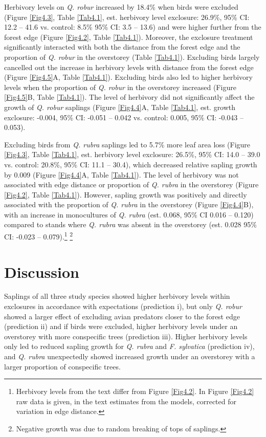 \documentclass[b5paper,10pt]{book} %
\begin{document}
Herbivory levels on \textit{Q. robur} increased by 18.4\% when birds were excluded (Figure \ref{Fig4.3}, Table \ref{Tab4.1}, est. herbivory level exclosure: 26.9\%, 95\% CI: 12.2 -- 41.6 vs. control: 8.5\% 95\% CI: 3.5 -- 13.6) and were higher further from the forest edge (Figure \ref{Fig4.2}, Table \ref{Tab4.1}). Moreover, the exclosure treatment significantly interacted with both the distance from the forest edge and the proportion of \textit{Q. robur} in the overstorey (Table \ref{Tab4.1}). Excluding birds largely cancelled out the increase in herbivory levels with distance from the forest edge (Figure \ref{Fig4.5}A, Table \ref{Tab4.1}). Excluding birds also led to higher herbivory levels when the proportion of \textit{Q. robur} in the overstorey increased (Figure \ref{Fig4.5}B, Table \ref{Tab4.1}). The level of herbivory did not significantly affect the growth of \textit{Q. robur} saplings (Figure \ref{Fig4.4}A, Table \ref{Tab4.1}, est. growth exclosure: -0.004, 95\% CI: -0.051 -- 0.042 vs. control: 0.005, 95\% CI: -0.043 -- 0.053). 

Excluding birds from \textit{Q. rubra} saplings led to 5.7\% more leaf area loss (Figure \ref{Fig4.3}, Table \ref{Tab4.1}, est. herbivory level exclosure: 26.5\%, 95\% CI: 14.0 -- 39.0 vs. control: 20.8\%, 95\% CI: 11.1 -- 30.4), which decreased relative sapling growth by 0.009 (Figure \ref{Fig4.4}A, Table \ref{Tab4.1}). The level of herbivory was not associated with edge distance or proportion of \textit{Q. rubra} in the overstorey (Figure \ref{Fig4.2}, Table \ref{Tab4.1}). However, sapling growth was positively and directly associated with the proportion of \textit{Q. rubra} in the overstorey (Figure \ref{Fig4.4}B), with an increase in monocultures of \textit{Q. rubra} (est. 0.068, 95\% CI 0.016 -- 0.120) compared to stands where \textit{Q. rubra} was absent in the overstorey (est. 0.028 95\% CI: -0.023 -- 0.079).\footnote{Herbivory levels from the text differ from Figure \ref{Fig4.2}. In Figure \ref{Fig4.2} raw data is given, in the text estimates from the models, corrected for variation in edge distance.} \footnote{Negative growth was due to random breaking of tops of saplings.} 


	\section{Discussion}

	Saplings of all three study species showed higher herbivory levels within exclosures in accordance with expectations (prediction i), but only \textit{Q. robur} showed a larger effect of excluding avian predators closer to the forest edge (prediction ii) and if birds were excluded, higher herbivory levels under an overstorey with more conspecific trees (prediction iii). Higher herbivory levels only led to reduced sapling growth for \textit{Q. rubra} and \textit{F. sylvatica} (prediction iv), and \textit{Q. rubra} unexpectedly showed increased growth under an overstorey with a larger proportion of conspecific trees.
\end{document}
